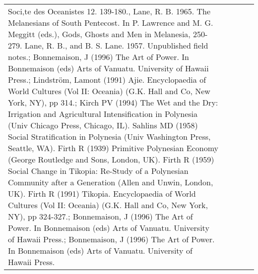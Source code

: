 \begin{longtable}{p{2cm}p{2cm}p{2cm}p{5cm}p{7cm}}
Soci‚te des Oceanistes 12. 139-180., Lane, R. B. 1965. The Melanesians of South Pentecost. In P. Lawrence and M. G. Meggitt (eds.), Gods, Ghosts and Men in Melanesia, 250-279. Lane, R. B., and B. S. Lane. 1957. Unpublished field notes.; Bonnemaison, J (1996) The Art of Power. In Bonnemaison (eds) Arts of Vanuatu. University of Hawaii Press.; Lindström, Lamont (1991) Ajie. Encyclopaedia of World Cultures (Vol II: Oceania) (G.K. Hall and Co, New York, NY), pp 314.; Kirch PV (1994) The Wet and the Dry: Irrigation and Agricultural Intensification in Polynesia (Univ Chicago Press, Chicago, IL). Sahlins MD (1958) Social Stratification in Polynesia (Univ Washington Press, Seattle, WA). Firth R (1939) Primitive Polynesian Economy (George Routledge and Sons, London, UK). Firth R (1959) Social Change in Tikopia: Re-Study of a Polynesian Community after a Generation (Allen and Unwin, London, UK). Firth R (1991) Tikopia. Encyclopaedia of World Cultures (Vol II: Oceania) (G.K. Hall and Co, New York, NY), pp 324-327.; Bonnemaison, J (1996) The Art of Power. In Bonnemaison (eds) Arts of Vanuatu. University of Hawaii Press.; Bonnemaison, J (1996) The Art of Power. In Bonnemaison (eds) Arts of Vanuatu. University of Hawaii Press. \\ 

\end{longtable}
